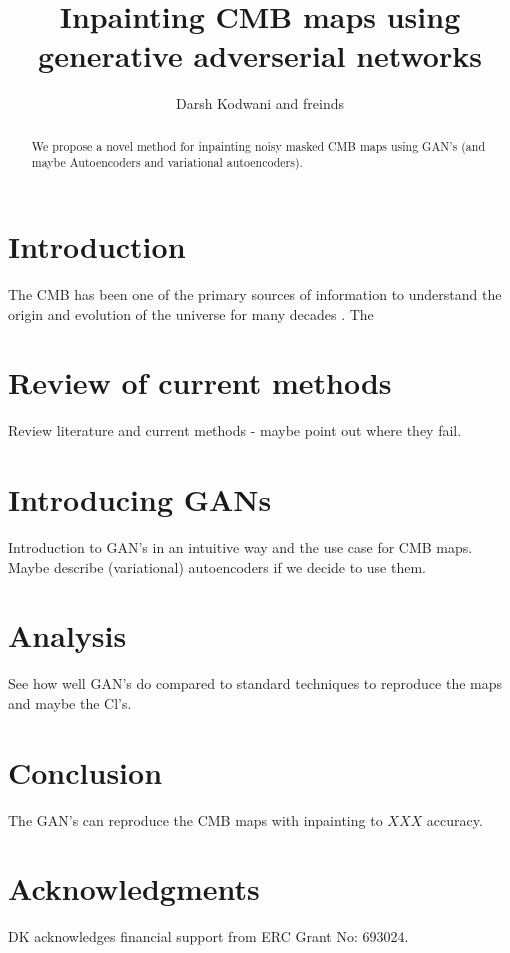 \documentclass[aps,prd,twocolumn,amsmath,amssymb,floatfix,nofootinbib,superscriptaddress]{revtex4-1}
\begin{document}
\title{Inpainting CMB maps using generative adverserial networks }

\author{Darsh Kodwani and freinds}

\begin{abstract}
We propose a novel method for inpainting noisy masked CMB maps using GAN's (and maybe Autoencoders and variational autoencoders). 

\end{abstract}

\maketitle


\section{Introduction}

The CMB has been one of the primary sources of information to understand the origin and evolution of the universe for many decades \cite{}. 
The 

\section{Review of current methods}

Review literature and current methods - maybe point out where they fail.
\section{Introducing GANs}

Introduction to GAN's in an intuitive way and the use case for CMB maps. Maybe describe (variational) autoencoders if we decide to use them. 
\section{Analysis}

See how well GAN's do compared to standard techniques to reproduce the maps and maybe the Cl's.

\section{Conclusion}

The GAN's can reproduce the CMB maps with inpainting to $XXX$ accuracy.

\section*{Acknowledgments}
\noindent

DK acknowledges financial support from ERC Grant No: 693024. 


\end{document}
